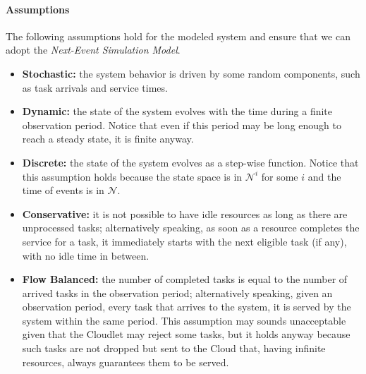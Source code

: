 \paragraph{Assumptions}
The following assumptions hold for the modeled system and ensure that we can adopt the \textit{Next-Event Simulation Model}.

\begin{itemize}
	\item \textbf{Stochastic:} the system behavior is driven by some random components, such as task arrivals and service times.
	
	\item \textbf{Dynamic:} the state of the system evolves with the time during a finite observation period. Notice that even if this period may be long enough to reach a steady state, it is finite anyway.
	
	\item \textbf{Discrete:} the state of the system evolves as a step-wise function. Notice that this assumption holds because the state space is in $\mathcal{N}^{i}$ for some $i$ and the time of events is in $\mathcal{N}$.
	
	\item \textbf{Conservative:} it is not possible to have idle resources as long as there are unprocessed tasks; alternatively speaking, as soon as a resource completes the service for a task, it immediately starts with the next eligible task (if any), with no idle time in between.
	
	\item \textbf{Flow Balanced:} the number of completed tasks is equal to the number of  arrived tasks in the observation period; alternatively speaking, given an observation period, every task that arrives to the system, it is served by the system within the same period. This assumption may sounds unacceptable given that the Cloudlet may reject some tasks, but it holds anyway because such tasks are not dropped but sent to the Cloud that, having infinite resources, always guarantees them to be served.
\end{itemize}